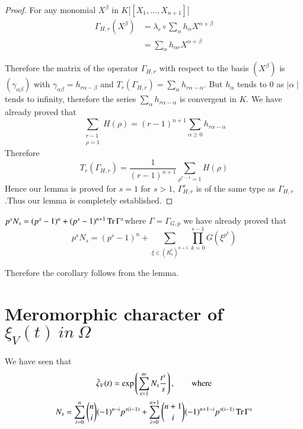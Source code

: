 \begin{proof}%
  For any monomial $X^\beta$ in $K \big[ [X_1,\ldots,  X_{n + 1}] \big]$
  \begin{align*}
    \Gamma_{H,r} (X^\beta) &= \lambda_r \circ \sum_{\alpha} h_\alpha
    X^{\alpha + \beta} \\ 
    &= \sum_\alpha h_{\alpha r} X^{\alpha+ \beta}
  \end{align*}

  Therefore the matrix of the operator $\Gamma_{H,r}$ with respect to
  the basis $(X^\beta)$ is $(\gamma_{\alpha \beta})$
  with $\gamma_{\alpha \beta} = h_{r \alpha -\beta} $ and $T_r
  (\Gamma_{H,r}) = \sum \limits_{\alpha} h_{r \alpha-\alpha} $. 
  But $h_\alpha$ tends to $0$ as $\mid \alpha \mid $ tends to
  infinity, therefore the series $\sum \limits_{\alpha} h_{r \alpha -
    \alpha} $ is convergent in $K$. We have already proved that  
  $$
  \sum_{\substack{r-1\\ \rho = 1}} H (\rho) = (r-1)^{n+1} \sum_{\alpha
    \geq  0} h_{r \alpha - \alpha}  
  $$
  Therefore
  $$
  T_r (\Gamma_{H,r}) = \frac{1}{(r-1)^{n+1}}
  \sum_{\rho^{r-1}=1} H (\rho) 
  $$
  Hence our lemma is proved for $s = 1$ for $s > 1$,
  $\Gamma^{s}_{H,r}$ is of the same type as $\Gamma_{H,r}$.Thus our
  lemma is completely established. 
 \end{proof} 
 
 \begin{coro*}
   $p^s N_s = (p^s-1)^n +(p^s-1)^{n+1} \operatorname{Tr} \Gamma^s$\pageoriginale where $\Gamma =
   \Gamma_{G,p}$ we have already proved that 
   $$
   p^s N_s =(p^s-1)^n + \sum_{\xi \in (R^*_s)^{n+1}} \prod^{s-1}_{k=0}
   G(\xi^{p^{k}}) 
   $$

   Therefore the corollary follows from the lemma.
 \end{coro*} 
 
\section{Meromorphic character of $\xi_V (t) ~\textit{in}~
  \Omega$}\label{part3:chap2:sec10}  
 
 We have seen that 
\begin{gather*}
 \tilde{\zeta}_V (t) = \exp \left( \sum^{\infty}_{s=1} N_s
 \frac{t^s}{s}\right), \qquad  \text{where}\\ 
  N_s = \sum^{n}_{i=0} \binom{n}{i} (-1)^{n-i} p^{s(i-1)}+ \sum^{n+1}_{i=0}
  \binom{n+1}{i} (-1)^{n+1-i} p^{s(i-1)} \operatorname{Tr} \Gamma^s 
\end{gather*}
  
